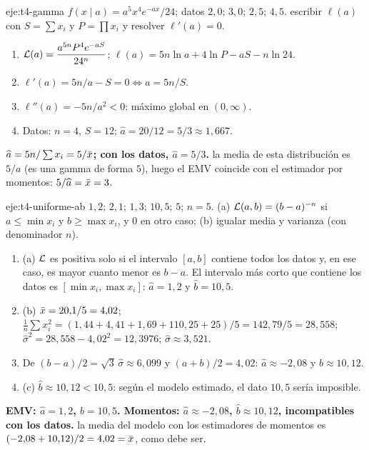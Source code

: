 \begin{solucion}{eje:t4-gamma}
\datos $f(x\mid a)=a^{5}x^{4}e^{-ax}/24$; datos $2{,}0;\allowbreak\,3{,}0;\allowbreak\,2{,}5;\allowbreak\,4{,}5$.
\planteamiento escribir $\ell(a)$ con $S=\sum x_i$ y $P=\prod x_i$ y resolver $\ell'(a)=0$.
\pasos
\begin{enumerate}[label=\arabic*.]
  \item $\mathcal{L}(a)=\dfrac{a^{5n}P^{4}e^{-aS}}{24^{n}}$; $\ell(a)=5n\ln a+4\ln P-aS-n\ln24$.
  \item $\ell'(a)=5n/a-S=0\iff a=5n/S$.
  \item $\ell''(a)=-5n/a^{2}<0$: máximo global en $(0,\infty)$.
  \item Datos: $n=4$, $S=12$; $\widehat a=20/12=5/3\approx1{,}667$.
\end{enumerate}
\resultado \textbf{$\widehat a=5n/\sum x_i=5/\bar{x}$; con los datos, $\widehat a=5/3$.}
\comprobacion la media de esta distribución es $5/a$ (es una gamma de forma $5$), luego el EMV coincide con el estimador por momentos: $5/\widehat a=\bar{x}=3$.
\end{solucion}

\begin{solucion}{eje:t4-uniforme-ab}
\datos $1{,}2;\allowbreak\,2{,}1;\allowbreak\,1{,}3;\allowbreak\,10{,}5;\allowbreak\,5$; $n=5$.
\planteamiento (a) $\mathcal{L}(a,b)=(b-a)^{-n}$ si $a\le\min x_i$ y $b\ge\max x_i$, y $0$ en otro caso; (b) igualar media y varianza (con denominador $n$).
\pasos
\begin{enumerate}[label=\arabic*.]
  \item (a) $\mathcal{L}$ es positiva solo si el intervalo $[a,b]$ contiene todos los datos y, en ese caso, es mayor cuanto menor es $b-a$. El intervalo más corto que contiene los datos es $[\min x_i,\max x_i]$: $\widehat a=1{,}2$ y $\widehat b=10{,}5$.
  \item (b) $\bar{x}=20{,}1/5=4{,}02$; $\frac1n\sum x_i^{2}=(1{,}44+4{,}41+1{,}69+110{,}25+25)/5=142{,}79/5=28{,}558$; $\widehat\sigma^{2}=28{,}558-4{,}02^{2}=12{,}3976$; $\widehat\sigma\approx3{,}521$.
  \item De $(b-a)/2=\sqrt3\,\widehat\sigma\approx6{,}099$ y $(a+b)/2=4{,}02$: $\widehat a\approx-2{,}08$ y $\widehat b\approx10{,}12$.
  \item (c) $\widehat b\approx10{,}12<10{,}5$: según el modelo estimado, el dato $10{,}5$ sería imposible.
\end{enumerate}
\resultado \textbf{EMV: $\widehat a=1{,}2$, $\widehat b=10{,}5$. Momentos: $\widehat a\approx-2{,}08$, $\widehat b\approx10{,}12$, incompatibles con los datos.}
\comprobacion la media del modelo con los estimadores de momentos es $(-2{,}08+10{,}12)/2=4{,}02=\bar{x}$, como debe ser.
\end{solucion}

